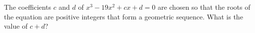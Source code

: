 The coefficients $c$ and $d$ of $x^3-19x^2+cx+d=0$ are chosen so that the roots of the equation are positive integers that form a geometric sequence. What is the value of $c+d$?
